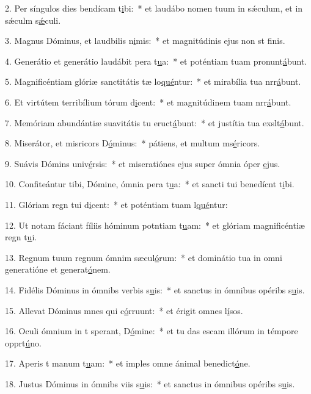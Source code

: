 2. Per síngulos dies bendícam t\uline{i}bi:~* et laudábo nomen tuum in sǽculum, et in sǽculm s\uline{ǽ}culi.\par 
3. Magnus Dóminus, et laudbilis n\uline{i}mis:~* et magnitúdinis ejus non st f\uline{i}nis.\par 
4. Generátio et generátio laudábit pera t\uline{u}a:~* et poténtiam tuam pronunt\uline{á}bunt.\par 
5. Magnificéntiam glóriæ sanctitátis tæ lo\uline{qué}ntur:~* et mirabília tua nrr\uline{á}bunt.\par 
6. Et virtútem terribílium tórum d\uline{i}cent:~* et magnitúdinem tuam nrr\uline{á}bunt.\par 
7. Memóriam abundántiæ suavitátis tu eruct\uline{á}bunt:~* et justítia tua exslt\uline{á}bunt.\par 
8. Miserátor, et misricors D\uline{ó}minus:~* pátiens, et multum ms\uline{é}ricors.\par 
9. Suávis Dómins univ\uline{é}rsis:~* et miseratiónes ejus super ómnia óper \uline{e}jus.\par 
10. Confiteántur tibi, Dómine, ómnia pera t\uline{u}a:~* et sancti tui benedícnt t\uline{i}bi.\par 
11. Glóriam regn tui d\uline{i}cent:~* et poténtiam tuam l\uline{qué}ntur:\par 
12. Ut notam fáciant fíliis hóminum potntiam t\uline{u}am:~* et glóriam magnificéntiæ regn t\uline{u}i.\par 
13. Regnum tuum regnum ómnim sæcul\uline{ó}rum:~* et dominátio tua in omni generatióne et generat\uline{ó}nem.\par 
14. Fidélis Dóminus in ómnibs verbis s\uline{u}is:~* et sanctus in ómnibus opéribs s\uline{u}is.\par 
15. Allevat Dóminus mnes qui c\uline{ó}rruunt:~* et érigit omnes l\uline{í}sos.\par 
16. Oculi ómnium in t sperant, D\uline{ó}mine:~* et tu das escam illórum in témpore opprt\uline{ú}no.\par 
17. Aperis t manum t\uline{u}am:~* et imples omne ánimal benedict\uline{ó}ne.\par 
18. Justus Dóminus in ómnibs viis s\uline{u}is:~* et sanctus in ómnibus opéribs s\uline{u}is.\par 
